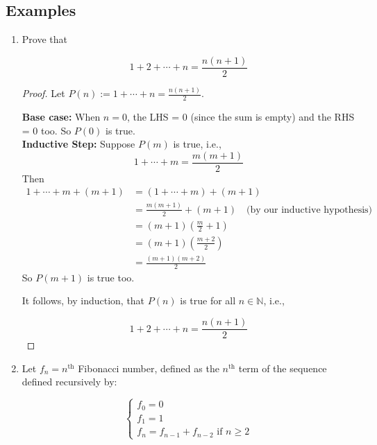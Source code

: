 \documentclass[11pt, draft]{article}
\begin{document}
\subsection{Examples}
\begin{enumerate}
    \item Prove that

          \[
              1 + 2 + \cdots + n = \frac{n(n+1)}{2}
          \]

          \begin{proof}

              Let $P(n) := 1 + \cdots + n = \frac{n(n+1)}{2}$.

              \textbf{Base case:} When $n = 0$, the LHS = 0 (since the sum is empty) and the RHS = 0 too. So $P(0)$ is true. \\
              \textbf{Inductive Step:} Suppose $P(m)$ is true, i.e.,
              \[
                  1 + \cdots + m = \frac{m(m+1)}{2}
              \]
              Then
              \[
                  \begin{aligned}
                      1 + \cdots + m + (m+1) & = (1 + \cdots + m) + (m+1)                                            \\
                                             & = \frac{m(m+1)}{2} + (m+1) \quad \text{(by our inductive hypothesis)} \\
                                             & = (m+1)\left(\frac{m}{2} + 1\right)                                   \\
                                             & = (m+1)\left(\frac{m+2}{2}\right)                                     \\
                                             & = \frac{(m+1)(m+2)}{2}
                  \end{aligned}
              \]
              So $P(m+1)$ is true too.

              It follows, by induction, that $P(n)$ is true for all $n \in \mathbb{N}$, i.e.,

              \[
                  1 + 2 + \cdots + n = \frac{n(n+1)}{2}
              \]
          \end{proof}
    \item Let $f_n = n^{\text{th}}$ Fibonacci number, defined as the $n^{\text{th}}$ term
          of the sequence defined recursively by:

          \[
              \left\{
              \begin{array}{l}
                  f_0 = 0 \\
                  f_1 = 1 \\
                  f_n = f_{n-1} + f_{n-2} \text{ if } n \geq 2
              \end{array}
              \right.
          \]


\end{enumerate}
\end{document}
